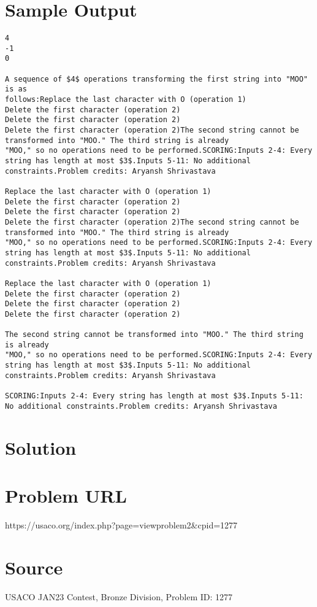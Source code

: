 \documentclass[12pt]{article}
\begin{document}
\section*{Sample Output}
\begin{verbatim}
4
-1
0

A sequence of $4$ operations transforming the first string into "MOO" is as
follows:Replace the last character with O (operation 1)
Delete the first character (operation 2)
Delete the first character (operation 2)
Delete the first character (operation 2)The second string cannot be transformed into "MOO." The third string is already
"MOO," so no operations need to be performed.SCORING:Inputs 2-4: Every string has length at most $3$.Inputs 5-11: No additional constraints.Problem credits: Aryansh Shrivastava

Replace the last character with O (operation 1)
Delete the first character (operation 2)
Delete the first character (operation 2)
Delete the first character (operation 2)The second string cannot be transformed into "MOO." The third string is already
"MOO," so no operations need to be performed.SCORING:Inputs 2-4: Every string has length at most $3$.Inputs 5-11: No additional constraints.Problem credits: Aryansh Shrivastava

Replace the last character with O (operation 1)
Delete the first character (operation 2)
Delete the first character (operation 2)
Delete the first character (operation 2)

The second string cannot be transformed into "MOO." The third string is already
"MOO," so no operations need to be performed.SCORING:Inputs 2-4: Every string has length at most $3$.Inputs 5-11: No additional constraints.Problem credits: Aryansh Shrivastava

SCORING:Inputs 2-4: Every string has length at most $3$.Inputs 5-11: No additional constraints.Problem credits: Aryansh Shrivastava
\end{verbatim}

\section*{Solution}


\section*{Problem URL}
https://usaco.org/index.php?page=viewproblem2&cpid=1277

\section*{Source}
USACO JAN23 Contest, Bronze Division, Problem ID: 1277
\end{document}
